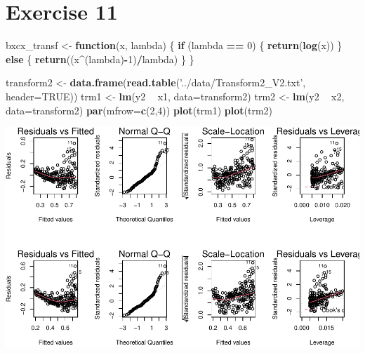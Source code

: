\documentclass[]{article}
\newenvironment{Shaded}{\begin{snugshade}}{\end{snugshade}}
\newcommand{\ControlFlowTok}[1]{\textcolor[rgb]{0.13,0.29,0.53}{\textbf{#1}}}
\newcommand{\DataTypeTok}[1]{\textcolor[rgb]{0.13,0.29,0.53}{#1}}
\newcommand{\DecValTok}[1]{\textcolor[rgb]{0.00,0.00,0.81}{#1}}
\newcommand{\KeywordTok}[1]{\textcolor[rgb]{0.13,0.29,0.53}{\textbf{#1}}}
\newcommand{\NormalTok}[1]{#1}
\newcommand{\OperatorTok}[1]{\textcolor[rgb]{0.81,0.36,0.00}{\textbf{#1}}}
\newcommand{\OtherTok}[1]{\textcolor[rgb]{0.56,0.35,0.01}{#1}}
\newcommand{\StringTok}[1]{\textcolor[rgb]{0.31,0.60,0.02}{#1}}
\begin{document}
\hypertarget{exercise-11}{%
\section{Exercise 11}\label{exercise-11}}

\begin{Shaded}
\begin{Highlighting}[]
\NormalTok{bxcx_transf <-}\StringTok{ }\ControlFlowTok{function}\NormalTok{(x, lambda) \{}
    \ControlFlowTok{if}\NormalTok{ (lambda }\OperatorTok{==}\StringTok{ }\DecValTok{0}\NormalTok{) \{}
        \KeywordTok{return}\NormalTok{(}\KeywordTok{log}\NormalTok{(x))}
\NormalTok{    \} }\ControlFlowTok{else}\NormalTok{ \{}
        \KeywordTok{return}\NormalTok{((x}\OperatorTok{^}\NormalTok{(lambda)}\OperatorTok{-}\DecValTok{1}\NormalTok{)}\OperatorTok{/}\NormalTok{lambda)}
\NormalTok{    \}}
\NormalTok{\}}
\end{Highlighting}
\end{Shaded}

\begin{Shaded}
\begin{Highlighting}[]
\NormalTok{transform2 <-}\StringTok{ }\KeywordTok{data.frame}\NormalTok{(}\KeywordTok{read.table}\NormalTok{(}\StringTok{'../data/Transform2_V2.txt'}\NormalTok{, }\DataTypeTok{header=}\OtherTok{TRUE}\NormalTok{))}
\NormalTok{trm1 <-}\StringTok{ }\KeywordTok{lm}\NormalTok{(y2 }\OperatorTok{~}\StringTok{ }\NormalTok{x1, }\DataTypeTok{data=}\NormalTok{transform2)}
\NormalTok{trm2 <-}\StringTok{ }\KeywordTok{lm}\NormalTok{(y2 }\OperatorTok{~}\StringTok{ }\NormalTok{x2, }\DataTypeTok{data=}\NormalTok{transform2)}
\KeywordTok{par}\NormalTok{(}\DataTypeTok{mfrow=}\KeywordTok{c}\NormalTok{(}\DecValTok{2}\NormalTok{,}\DecValTok{4}\NormalTok{))}
\KeywordTok{plot}\NormalTok{(trm1)}
\KeywordTok{plot}\NormalTok{(trm2)}
\end{Highlighting}
\end{Shaded}

\includegraphics{./figures/unnamed-chunk-23-1.pdf}
\end{document}
